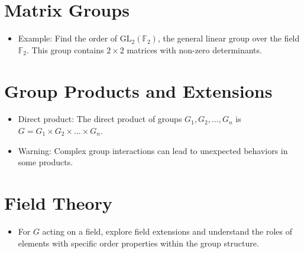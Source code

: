 \documentclass{article}
\begin{document}
\section*{Matrix Groups}
\begin{itemize}
    \item Example: Find the order of \( \text{GL}_2(\mathbb{F}_2) \), the general linear group over the field $\mathbb{F}_2$. This group contains $2 \times 2$ matrices with non-zero determinants.
\end{itemize}

\section*{Group Products and Extensions}
\begin{itemize}
    \item Direct product: The direct product of groups \( G_1, G_2, \ldots, G_n \) is \( G = G_1 \times G_2 \times \ldots \times G_n \).
    \item Warning: Complex group interactions can lead to unexpected behaviors in some products.
\end{itemize}

\section*{Field Theory}
\begin{itemize}
    \item For \( G \) acting on a field, explore field extensions and understand the roles of elements with specific order properties within the group structure.
\end{itemize}
\end{document}
